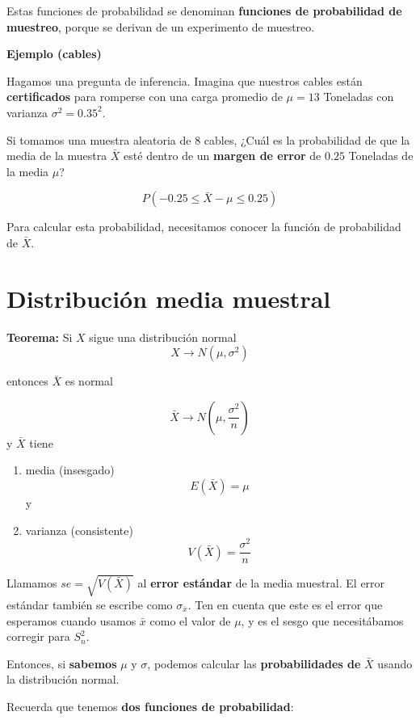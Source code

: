 \documentclass[
]{book}
\begin{document}
Estas funciones de probabilidad se denominan \textbf{funciones de probabilidad de muestreo}, porque se derivan de un experimento de muestreo.

\textbf{Ejemplo (cables)}

Hagamos una pregunta de inferencia. Imagina que nuestros cables están \textbf{certificados} para romperse con una carga promedio de \(\mu = 13\) Toneladas con varianza \(\sigma^2=0.35^2\).

Si tomamos una muestra aleatoria de \(8\) cables, ¿Cuál es la probabilidad de que la media de la muestra \(\bar{X}\) esté dentro de un \textbf{margen de error} de \(0.25\) Toneladas de la media \(\mu\)?

\[P(- 0.25\leq \bar{X}-\mu \leq 0.25)\]

Para calcular esta probabilidad, necesitamos conocer la función de probabilidad de \(\bar{X}\).

\hypertarget{distribuciuxf3n-media-muestral}{%
\section{Distribución media muestral}\label{distribuciuxf3n-media-muestral}}

\textbf{Teorema:} Si \(X\) sigue una distribución normal \[X \rightarrow N(\mu, \sigma^2)\]

entonces \(\bar{X}\) es normal

\[\bar{X} \rightarrow N(\mu, \frac{\sigma^2}{n})\]
y \(\bar{X}\) tiene

\begin{enumerate}
\def\labelenumi{\arabic{enumi})}
\item
  media (insesgado)
  \[E(\bar{X})=\mu\]
  y
\item
  varianza (consistente)
  \[V(\bar{X})=\frac{\sigma^2}{n}\]
\end{enumerate}

Llamamos \(se=\sqrt{V(\bar{X})}\) al \textbf{error estándar} de la media muestral. El error estándar también se escribe como \(\sigma_{\bar{x}}\). Ten en cuenta que este es el error que esperamos cuando usamos \(\bar{x}\) como el valor de \(\mu\), y es el sesgo que necesitábamos corregir para \(S_n^2\).

Entonces, si \textbf{sabemos} \(\mu\) y \(\sigma\), podemos calcular las \textbf{probabilidades de} \(\bar{X}\) usando la distribución normal.

Recuerda que tenemos \textbf{dos funciones de probabilidad}:
\end{document}
